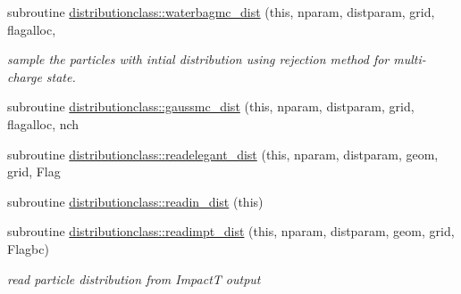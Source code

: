 \begin{DoxyCompactItemize}
subroutine \mbox{\hyperlink{namespacedistributionclass_a50c29600de2efb52342fa5b2e2e21283}{distributionclass\+::waterbagmc\+\_\+dist}} (this, nparam, distparam, grid, flagalloc,
\begin{DoxyCompactList}\small\item\em sample the particles with intial distribution using rejection method for multi-\/charge state. \end{DoxyCompactList}\item 
subroutine \mbox{\hyperlink{namespacedistributionclass_ae3590d26a730b67c67e6e6597196f4bd}{distributionclass\+::gaussmc\+\_\+dist}} (this, nparam, distparam, grid, flagalloc, nch
\item 
subroutine \mbox{\hyperlink{namespacedistributionclass_acf080fd52aac8287d955bcfd88362c07}{distributionclass\+::readelegant\+\_\+dist}} (this, nparam, distparam, geom, grid, Flag
\item 
subroutine \mbox{\hyperlink{namespacedistributionclass_a4efaf82e4273159a0e2651238502bbf2}{distributionclass\+::readin\+\_\+dist}} (this)
\item 
subroutine \mbox{\hyperlink{namespacedistributionclass_ab1d0719de2c779c9d5e8a5f353555193}{distributionclass\+::readimpt\+\_\+dist}} (this, nparam, distparam, geom, grid, Flagbc)
\begin{DoxyCompactList}\small\item\em read particle distribution from ImpactT output \end{DoxyCompactList}\end{DoxyCompactItemize}
